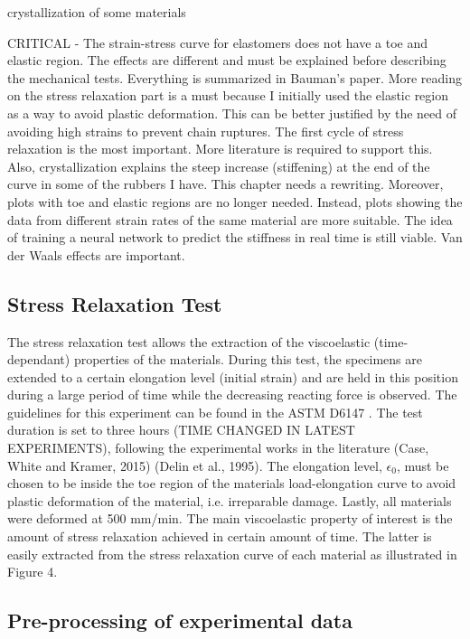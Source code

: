 crystallization of some materials

CRITICAL - The strain-stress curve for elastomers does not have a toe and elastic region. The effects are different and must be explained before describing the mechanical tests. Everything is summarized in Bauman's paper. More reading on the stress relaxation part is a must because I initially used the elastic region as a way to avoid plastic deformation. This can be better justified by the need of avoiding high strains to prevent chain ruptures. The first cycle of stress relaxation is the most important. More literature is required to support this. Also, crystallization explains the steep increase (stiffening) at the end of the curve in some of the rubbers I have. This chapter needs a rewriting. Moreover, plots with toe and elastic regions are no longer needed. Instead, plots showing the data from different strain rates of the same material are more suitable. The idea of training a neural network to predict the stiffness in real time is still viable. Van der Waals effects are important.

\subsection{Stress Relaxation Test}

The stress relaxation test allows the extraction of the viscoelastic (time-dependant) properties of the materials. During this test, the specimens are extended to a certain elongation level (initial strain) and are held in this position during a large period of time while the decreasing reacting force is observed. The guidelines for this experiment can be found in the ASTM D6147 \cite{astm2002d6147}. The test duration is set to three hours (TIME CHANGED IN LATEST EXPERIMENTS), following the experimental works in the literature (Case, White and Kramer, 2015) (Delin et al., 1995). The elongation level, $\epsilon_0$, must be chosen to be inside the toe region of the materials load-elongation curve to avoid plastic deformation of the material, i.e. irreparable damage. Lastly, all materials were deformed at 500 mm/min. The main viscoelastic property of interest is the amount of stress relaxation achieved in certain amount of time. The latter is easily extracted from the stress relaxation curve of each material as illustrated in Figure 4. 

\subsection{Pre-processing of experimental data}

